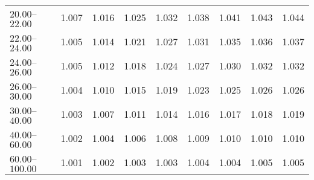 \begin{table}[htp]
\begin{tiny}
\begin{center}
\begin{tabular}{|l|c|c|c|c|c|c|c|c|}
$20.00$--$22.00$ & 1.007 & 1.016 & 1.025 & 1.032 & 1.038 & 1.041 & 1.043 & 1.044  \\
$22.00$--$24.00$ & 1.005 & 1.014 & 1.021 & 1.027 & 1.031 & 1.035 & 1.036 & 1.037  \\
$24.00$--$26.00$ & 1.005 & 1.012 & 1.018 & 1.024 & 1.027 & 1.030 & 1.032 & 1.032  \\
$26.00$--$30.00$ & 1.004 & 1.010 & 1.015 & 1.019 & 1.023 & 1.025 & 1.026 & 1.026  \\
$30.00$--$40.00$ & 1.003 & 1.007 & 1.011 & 1.014 & 1.016 & 1.017 & 1.018 & 1.019  \\
$40.00$--$60.00$ & 1.002 & 1.004 & 1.006 & 1.008 & 1.009 & 1.010 & 1.010 & 1.010  \\
$60.00$--$100.00$ & 1.001 & 1.002 & 1.003 & 1.003 & 1.004 & 1.004 & 1.005 & 1.005  \\
\hline
\end{tabular} 
             \end{center} 
             \end{tiny} 
             \label{tab:sa_offP_jpsi} 
             \end{table}


